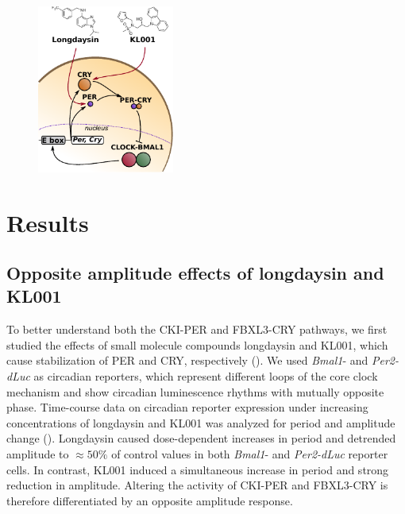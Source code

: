 \begin{figure}[tbp]
  \centering
  \includegraphics[width=0.4\textwidth]{chap4/figures/fig1_schem.pdf}
  \label{fig:4-1a}
\end{figure}

\section{Results}

\subsection{Opposite amplitude effects of longdaysin and KL001}
To better understand both the CKI-PER and FBXL3-CRY pathways, we first studied the effects of small molecule compounds longdaysin and KL001, which cause stabilization of PER and CRY, respectively \cite{Hirota2010, Hirota2012} (). 
We used {\it Bmal1}- and {\it Per2-dLuc} as circadian reporters, which represent different loops of the core clock mechanism and show circadian luminescence rhythms with mutually opposite phase. 
Time-course data on circadian reporter expression under increasing concentrations of longdaysin and KL001 \cite{Hirota2012} was analyzed for period and amplitude change (). 
Longdaysin caused dose-dependent increases in period and detrended amplitude to $\approx 50\%$ of control values in both {\it Bmal1}- and {\it Per2-dLuc} reporter cells. 
In contrast, KL001 induced a simultaneous increase in period and strong reduction in amplitude. 
Altering the activity of CKI-PER and FBXL3-CRY is therefore differentiated by an opposite amplitude response.

